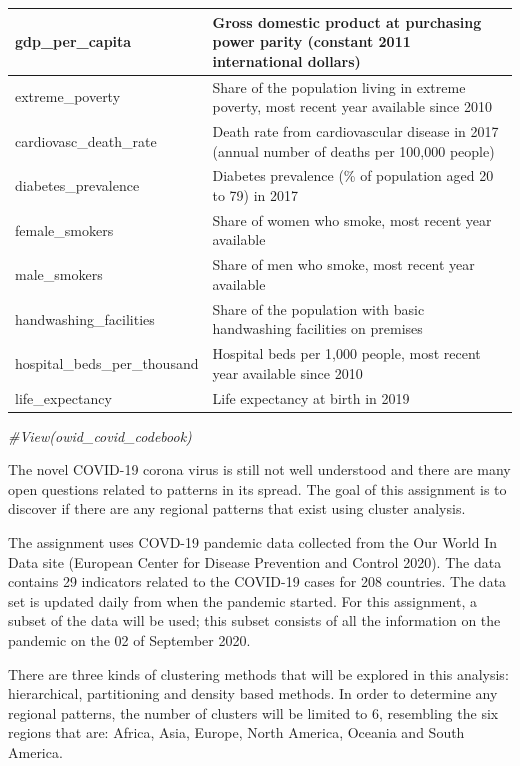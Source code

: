 \documentclass[
]{article}
\newenvironment{Shaded}{\begin{snugshade}}{\end{snugshade}}
\newcommand{\CommentTok}[1]{\textcolor[rgb]{0.56,0.35,0.01}{\textit{#1}}}
\begin{document}
\begin{table}
\begin{tabular}[t]{|>{}l|>{}l|}
\hline
gdp\_per\_capita & Gross domestic product at purchasing power parity (constant 2011 international dollars)\\
\hline
extreme\_poverty & Share of the population living in extreme poverty, most recent year available since 2010\\
\hline
cardiovasc\_death\_rate & Death rate from cardiovascular disease in 2017 (annual number of deaths per 100,000 people)\\
\hline
diabetes\_prevalence & Diabetes prevalence (\% of population aged 20 to 79) in 2017\\
\hline
female\_smokers & Share of women who smoke, most recent year available\\
\hline
male\_smokers & Share of men who smoke, most recent year available\\
\hline
handwashing\_facilities & Share of the population with basic handwashing facilities on premises\\
\hline
hospital\_beds\_per\_thousand & Hospital beds per 1,000 people, most recent year available since 2010\\
\hline
life\_expectancy & Life expectancy at birth in 2019\\
\hline
\end{tabular}
\end{table}

\begin{Shaded}
\begin{Highlighting}[]
\CommentTok{#View(owid_covid_codebook)}
\end{Highlighting}
\end{Shaded}

\newpage
\abstract

The novel COVID-19 corona virus is still not well understood and there are many open questions related to patterns in its spread. The goal of this assignment is to discover if there are any regional patterns that exist using cluster analysis.

The assignment uses COVD-19 pandemic data collected from the Our World In Data site (European Center for Disease Prevention and Control 2020). The data contains 29 indicators related to the
COVID-19 cases for 208 countries. The data set is updated daily from when the pandemic started. For this assignment, a subset of the
data will be used; this subset consists of all the information on the pandemic on the 02 of September
2020.

There are three kinds of clustering methods that will be explored in this analysis: hierarchical, partitioning and density based methods. In order to determine any regional patterns, the number of clusters will be limited to 6, resembling the six regions that are: Africa, Asia, Europe, North America, Oceania and South America.
\end{document}
